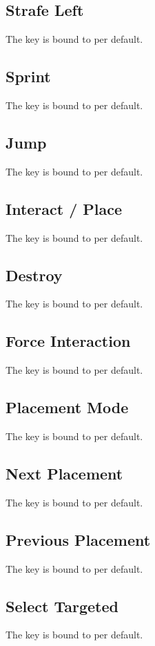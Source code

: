\subsection{Strafe Left}\label{subsec:controls_strafe left}
The key is bound to
per default.

\subsection{Sprint}\label{subsec:controls_sprint}
The key is bound to
per default.

\subsection{Jump}\label{subsec:controls_jump}
The key is bound to
per default.

\subsection{Interact / Place}\label{subsec:controls_interact / place}
The key is bound to
per default.

\subsection{Destroy}\label{subsec:controls_destroy}
The key is bound to
per default.

\subsection{Force Interaction}\label{subsec:controls_force interaction}
The key is bound to
per default.

\subsection{Placement Mode}\label{subsec:controls_placement mode}
The key is bound to
per default.

\subsection{Next Placement}\label{subsec:controls_next placement}
The key is bound to
per default.

\subsection{Previous Placement}\label{subsec:controls_previous placement}
The key is bound to
per default.

\subsection{Select Targeted}\label{subsec:controls_select targeted}
The key is bound to
per default.
